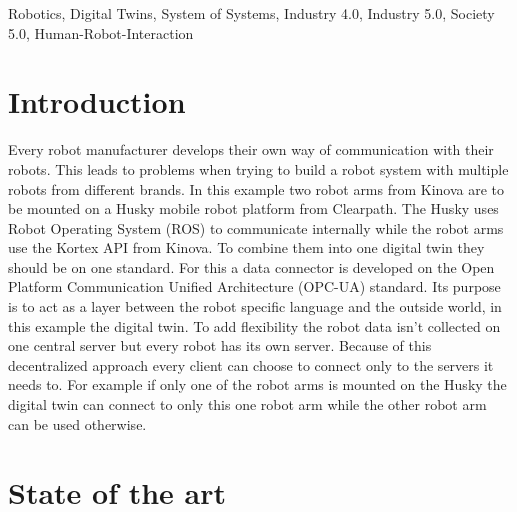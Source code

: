 \documentclass[conference]{IEEEtran}
\begin{document}
\begin{IEEEkeywords}
Robotics, Digital Twins, System of Systems, Industry 4.0, Industry 5.0, Society 5.0, Human-Robot-Interaction
\end{IEEEkeywords}

\section{Introduction}
Every robot manufacturer develops their own way of communication with their robots.
This leads to problems when trying to build a robot system with multiple robots from different brands.
In this example two robot arms from Kinova are to be mounted on a Husky mobile robot platform from Clearpath.
The Husky uses Robot Operating System (ROS) to communicate internally while the robot arms use the Kortex API from Kinova.
To combine them into one digital twin they should be on one standard.
For this a data connector is developed on the Open Platform Communication Unified Architecture (OPC-UA) standard.
Its purpose is to act as a layer between the robot specific language and the outside world, in this example the digital twin.
To add flexibility the robot data isn't collected on one central server but every robot has its own server.
Because of this decentralized approach every client can choose to connect only to the servers it needs to.
For example if only one of the robot arms is mounted on the Husky the digital twin can connect to only this one robot arm while the other robot arm can be used otherwise.
\section{State of the art}
\end{document}
